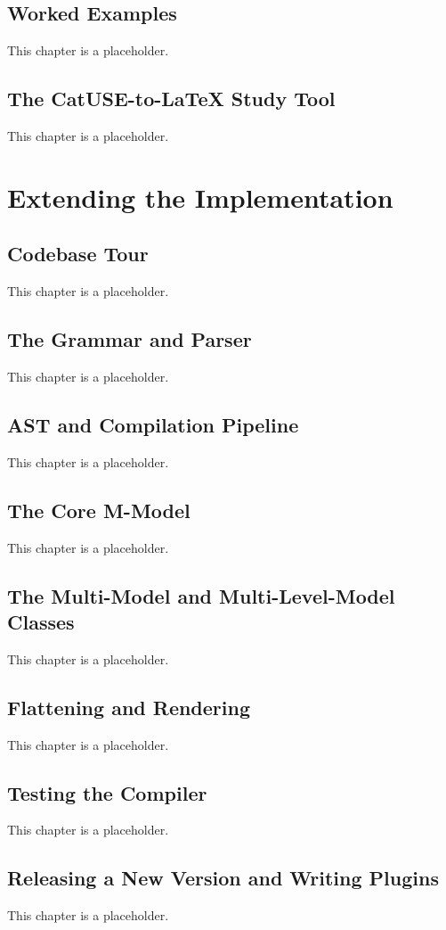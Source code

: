 \documentclass[11pt,twoside,a4paper]{book}
\begin{document}
\chapter{Worked Examples}
\label{sec:orgab622e4}
This chapter is a placeholder.
\chapter{The CatUSE-to-\LaTeX{} Study Tool}
\label{sec:orgb931df4}
This chapter is a placeholder.
\part{Extending the Implementation}
\label{sec:org745982f}
\chapter{Codebase Tour}
\label{sec:org92b8b93}
This chapter is a placeholder.
\chapter{The Grammar and Parser}
\label{sec:org96052cc}
This chapter is a placeholder.
\chapter{AST and Compilation Pipeline}
\label{sec:orgb6762f1}
This chapter is a placeholder.
\chapter{The Core M-Model}
\label{sec:org82be8e7}
This chapter is a placeholder.
\chapter{The Multi-Model and Multi-Level-Model Classes}
\label{sec:org1ad312f}
This chapter is a placeholder.
\chapter{Flattening and Rendering}
\label{sec:org4845d5d}
This chapter is a placeholder.
\chapter{Testing the Compiler}
\label{sec:orga228bfe}
This chapter is a placeholder.
\chapter{Releasing a New Version and Writing Plugins}
\label{sec:org7e48434}
This chapter is a placeholder.
\end{document}
